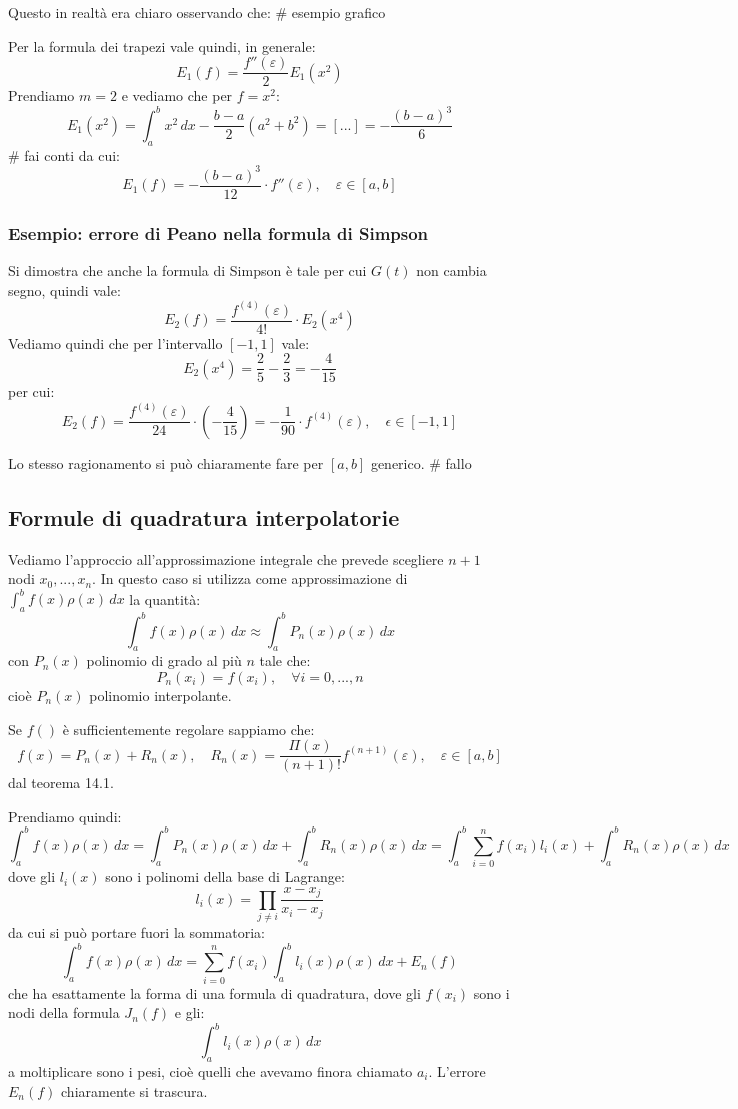 \documentclass[a4paper,11pt]{article}
\begin{document}
Questo in realtà era chiaro osservando che:
# esempio grafico

\par\smallskip

Per la formula dei trapezi vale quindi, in generale:
$$
E_1 (f) = \frac{f''(\varepsilon)}{2} E_1(x^2)
$$
Prendiamo $m = 2$ e vediamo che per $f = x^2$:
$$
E_1(x^2) = \int_a^b x^2 \, dx - \frac{b - a}{2} (a^2 + b^2) = [...] = - \frac{(b - a)^3}{6}
$$ # fai conti
da cui:
$$
E_1(f) = - \frac{(b - a)^3}{12} \cdot f''(\varepsilon), \quad \varepsilon \in [a, b]
$$

\subsubsection{Esempio: errore di Peano nella formula di Simpson}
Si dimostra che anche la formula di Simpson è tale per cui $G(t)$ non cambia segno, quindi vale:
$$
E_2(f) = \frac{f^(4) (\varepsilon)}{4!} \cdot E_2(x^4) 
$$
Vediamo quindi che per l'intervallo $[-1, 1]$ vale:
$$
E_2(x^4) = \frac{2}{5} - \frac{2}{3} = - \frac{4}{15}
$$
per cui:
$$
E_2(f) = \frac{f^{(4)}(\varepsilon)}{24} \cdot \left( - \frac{4}{15} \right) = -\frac{1}{90} \cdot f^{(4)} (\varepsilon), \quad \epsilon \in [-1, 1] 
$$

Lo stesso ragionamento si può chiaramente fare per $[a, b]$ generico. # fallo

\subsection{Formule di quadratura interpolatorie}
Vediamo l'approccio all'approssimazione integrale che prevede scegliere $n + 1$ nodi $x_0, ..., x_n$.
In questo caso si utilizza come approssimazione di $\int_a^b f(x) \rho(x) \, dx$ la quantità:
$$
\int_a^b f(x) \rho(x) \, dx \approx \int_a^b P_n(x) \rho(x) \, dx
$$
con $P_n(x)$ polinomio di grado al più $n$ tale che:
$$
P_n(x_i) = f(x_i), \quad \forall i = 0, ..., n
$$
cioè $P_n(x)$ polinomio interpolante.

Se $f()$ è sufficientemente regolare sappiamo che:
$$
f(x) = P_n(x) + R_n(x), \quad R_n(x) = \frac{\Pi (x)}{(n + 1)!} f^{(n + 1)} (\varepsilon), \quad \varepsilon \in [a, b]
$$
dal teorema 14.1.

Prendiamo quindi:
$$
\int_a^b f(x) \rho(x) \, dx = \int_a^b P_n(x) \rho(x) \, dx + \int_a^b R_n(x) \rho(x) \, dx = \int_a^b \sum_{i = 0}^n f(x_i) l_i(x) + \int_a^b R_n(x) \rho(x) \, dx
$$
dove gli $l_i(x)$ sono i polinomi della base di Lagrange:
$$
l_i(x) = \prod_{j \neq i} \frac{x - x_j}{x_i - x_j}
$$
da cui si può portare fuori la sommatoria:
$$
\int_a^b f(x) \rho(x) \, dx = \sum_{i = 0}^n f(x_i) \int_a^b l_i(x) \rho(x) \, dx + E_n(f)
$$
che ha esattamente la forma di una formula di quadratura, dove gli $f(x_i)$ sono i nodi della formula $J_n(f)$ e gli:
$$
\int_a^b l_i(x) \rho(x) \, dx
$$
a moltiplicare sono i pesi, cioè quelli che avevamo finora chiamato $a_i$.
L'errore $E_n(f)$ chiaramente si trascura.
\end{document}
